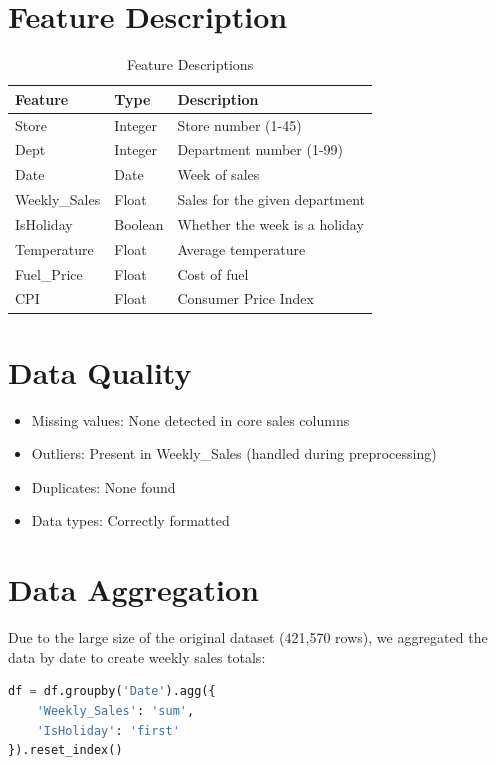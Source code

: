 \documentclass[12pt,a4paper]{report}
\begin{document}
\section{Feature Description}
\label{sec:features}
\begin{table}[H]
\centering
\caption{Feature Descriptions}
\begin{tabular}{p{3cm}p{2cm}p{7cm}}
\toprule
\textbf{Feature} & \textbf{Type} & \textbf{Description} \\
\midrule
Store & Integer & Store number (1-45) \\
Dept & Integer & Department number (1-99) \\
Date & Date & Week of sales \\
Weekly\_Sales & Float & Sales for the given department \\
IsHoliday & Boolean & Whether the week is a holiday \\
Temperature & Float & Average temperature \\
Fuel\_Price & Float & Cost of fuel \\
CPI & Float & Consumer Price Index \\
\bottomrule
\end{tabular}
\end{table}

\section{Data Quality}
\label{sec:data_quality}
\begin{itemize}
    \item Missing values: None detected in core sales columns
    \item Outliers: Present in Weekly\_Sales (handled during preprocessing)
    \item Duplicates: None found
    \item Data types: Correctly formatted
\end{itemize}

\section{Data Aggregation}
\label{sec:aggregation}
Due to the large size of the original dataset (421,570 rows), we aggregated the data by date to create weekly sales totals:

\begin{lstlisting}[language=Python]
df = df.groupby('Date').agg({
    'Weekly_Sales': 'sum',
    'IsHoliday': 'first'
}).reset_index()
\end{lstlisting}
\end{document}
